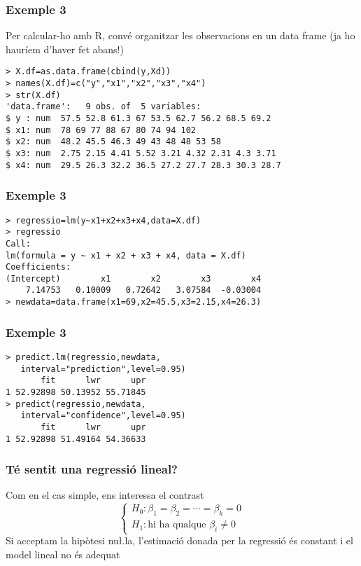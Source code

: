\documentclass[12pt,t]{beamer}
\theoremstyle{plain}
\theoremstyle{definition}
\begin{document}
\begin{frame}[fragile]
\frametitle{Exemple 3}

Per calcular-ho amb R, convé organitzar les observacions en un data frame (ja ho hauríem d'haver fet abans!)
{\footnotesize \begin{verbatim}
> X.df=as.data.frame(cbind(y,Xd))
> names(X.df)=c("y","x1","x2","x3","x4")
> str(X.df)
'data.frame':	9 obs. of  5 variables:
$ y : num  57.5 52.8 61.3 67 53.5 62.7 56.2 68.5 69.2
$ x1: num  78 69 77 88 67 80 74 94 102
$ x2: num  48.2 45.5 46.3 49 43 48 48 53 58
$ x3: num  2.75 2.15 4.41 5.52 3.21 4.32 2.31 4.3 3.71
$ x4: num  29.5 26.3 32.2 36.5 27.2 27.7 28.3 30.3 28.7
\end{verbatim}
}
\end{frame}

\begin{frame}[fragile]
\frametitle{Exemple 3}
\vspace*{-2ex}
\small

\begin{verbatim}
> regressio=lm(y~x1+x2+x3+x4,data=X.df)
> regressio
Call:
lm(formula = y ~ x1 + x2 + x3 + x4, data = X.df)
Coefficients:
(Intercept)        x1        x2        x3        x4  
    7.14753   0.10009   0.72642   3.07584  -0.03004  
> newdata=data.frame(x1=69,x2=45.5,x3=2.15,x4=26.3)
\end{verbatim}

\end{frame}

\begin{frame}[fragile]
\frametitle{Exemple 3}
\vspace*{-2ex}

\begin{verbatim}
> predict.lm(regressio,newdata,
   interval="prediction",level=0.95)
       fit      lwr      upr
1 52.92898 50.13952 55.71845
> predict(regressio,newdata,
   interval="confidence",level=0.95)
       fit      lwr      upr
1 52.92898 51.49164 54.36633
\end{verbatim}

\end{frame}

\begin{frame}
\frametitle{Té sentit una regressió lineal?}
Com en el cas simple, ens interessa el contrast
$$
\left\{\begin{array}{l} H_0: \beta_1=\beta_2=\cdots=\beta_k=0 \\
H_1: \mbox{hi ha qualque }\beta_i\not= 0 \end{array}
\right.
$$
Si acceptam la hipòtesi nu\l.la, l'estimació donada per la regressió és constant i el model lineal no és adequat

\end{frame}
\end{document}
